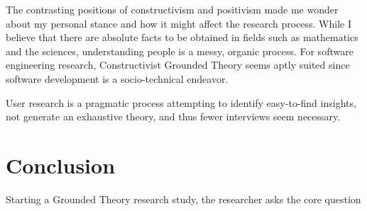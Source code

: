 The contrasting positions of constructivism and positivism made me wonder about my personal stance and how it might affect the research process. While I believe that there are absolute facts to be obtained in fields such as mathematics and the sciences, understanding people is a messy, organic process. For software engineering research, Constructivist Grounded Theory seems aptly suited since software development is a socio-technical endeavor.




User research is a pragmatic process attempting to identify easy-to-find insights, not generate an exhaustive theory, and thus fewer interviews seem necessary.



\section{Conclusion}
Starting a Grounded Theory research study, the researcher asks the core question   \cite{GlaserTheoreticalSensitivity}

